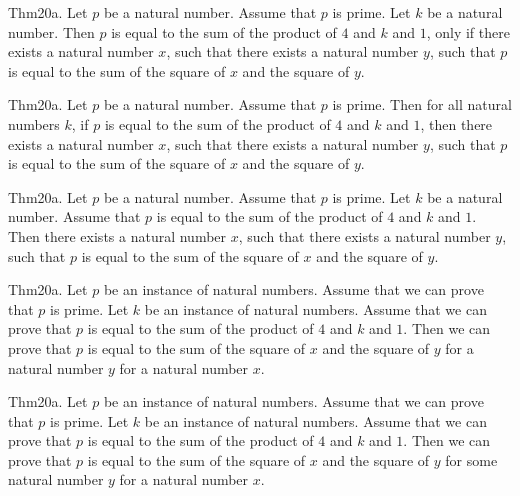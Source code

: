 \documentclass{article}
\begin{document}
Thm20a. Let $p$ be a natural number. Assume that $p$ is prime. Let $k$ be a natural number. Then $p$ is equal to the sum of the product of $4$ and $k$ and $1$, only if there exists a natural number $x$, such that there exists a natural number $y$, such that $p$ is equal to the sum of the square of $x$ and the square of $y$.

Thm20a. Let $p$ be a natural number. Assume that $p$ is prime. Then for all natural numbers $k$, if $p$ is equal to the sum of the product of $4$ and $k$ and $1$, then there exists a natural number $x$, such that there exists a natural number $y$, such that $p$ is equal to the sum of the square of $x$ and the square of $y$.

Thm20a. Let $p$ be a natural number. Assume that $p$ is prime. Let $k$ be a natural number. Assume that $p$ is equal to the sum of the product of $4$ and $k$ and $1$. Then there exists a natural number $x$, such that there exists a natural number $y$, such that $p$ is equal to the sum of the square of $x$ and the square of $y$.

Thm20a. Let $p$ be an instance of natural numbers. Assume that we can prove that $p$ is prime. Let $k$ be an instance of natural numbers. Assume that we can prove that $p$ is equal to the sum of the product of $4$ and $k$ and $1$. Then we can prove that $p$ is equal to the sum of the square of $x$ and the square of $y$ for a natural number $y$ for a natural number $x$.

Thm20a. Let $p$ be an instance of natural numbers. Assume that we can prove that $p$ is prime. Let $k$ be an instance of natural numbers. Assume that we can prove that $p$ is equal to the sum of the product of $4$ and $k$ and $1$. Then we can prove that $p$ is equal to the sum of the square of $x$ and the square of $y$ for some natural number $y$ for a natural number $x$.
\end{document}
